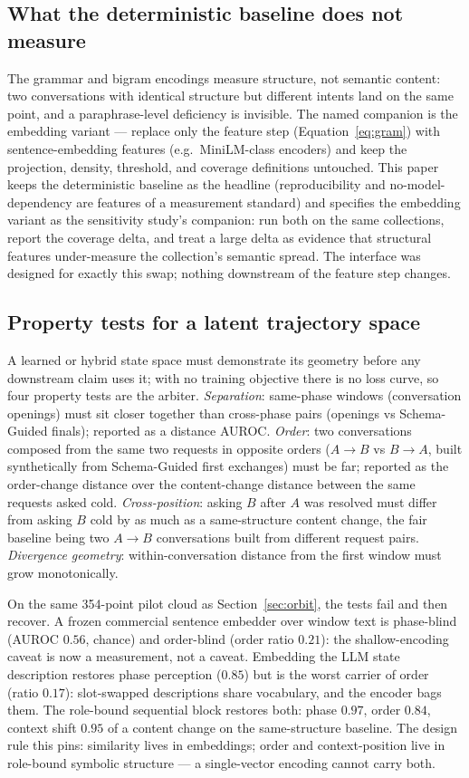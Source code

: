 \subsection{What the deterministic baseline does not measure}
The grammar and bigram encodings measure structure, not semantic content: two conversations
with identical structure but different intents land on the same point, and a paraphrase-level
deficiency is invisible.
The named companion is the embedding variant --- replace only the feature step
(Equation~\eqref{eq:gram}) with sentence-embedding features (e.g.\ MiniLM-class encoders) and
keep the projection, density, threshold, and coverage definitions untouched.
This paper keeps the deterministic baseline as the headline (reproducibility and
no-model-dependency are features of a measurement standard) and specifies the embedding
variant as the sensitivity study's companion: run both on the same collections, report the
coverage delta, and treat a large delta as evidence that structural features under-measure
the collection's semantic spread.
The interface was designed for exactly this swap; nothing downstream of the feature step
changes.

\subsection{Property tests for a latent trajectory space}
\label{sec:property_tests}
A learned or hybrid state space must demonstrate its geometry before any downstream claim
uses it; with no training objective there is no loss curve, so four property tests are the
arbiter.
\emph{Separation}: same-phase windows (conversation openings) must sit closer together than
cross-phase pairs (openings vs Schema-Guided finals); reported as a distance AUROC.
\emph{Order}: two conversations composed from the same two requests in opposite orders
($A\!\to\!B$ vs $B\!\to\!A$, built synthetically from Schema-Guided first exchanges) must
be far; reported as the order-change distance over the content-change distance between the
same requests asked cold.
\emph{Cross-position}: asking $B$ after $A$ was resolved must differ from asking $B$ cold
by as much as a same-structure content change, the fair baseline being two $A\!\to\!B$
conversations built from different request pairs.
\emph{Divergence geometry}: within-conversation distance from the first window must grow
monotonically.

On the same 354-point pilot cloud as Section~\ref{sec:orbit}, the tests fail and then
recover.
A frozen commercial sentence embedder over window text is phase-blind (AUROC $0.56$,
chance) and order-blind (order ratio $0.21$): the shallow-encoding caveat is now a
measurement, not a caveat.
Embedding the LLM state description restores phase perception ($0.85$) but is the worst
carrier of order (ratio $0.17$): slot-swapped descriptions share vocabulary, and the
encoder bags them.
The role-bound sequential block restores both: phase $0.97$, order $0.84$, context shift
$0.95$ of a content change on the same-structure baseline.
The design rule this pins: similarity lives in embeddings; order and context-position live
in role-bound symbolic structure --- a single-vector encoding cannot carry both.
